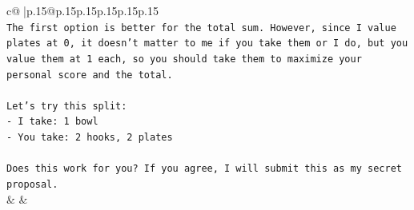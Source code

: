 \documentclass{article}
\begin{document}
{\begin{supertabular}{c@{$\;$}|p{.15\linewidth}@{}p{.15\linewidth}p{.15\linewidth}p{.15\linewidth}p{.15\linewidth}p{.15\linewidth}}
{{{\\ 
\texttt{The first option is better for the total sum. However, since I value plates at 0, it doesn't matter to me if you take them or I do, but you value them at 1 each, so you should take them to maximize your personal score and the total.} \\
\\ 
\texttt{Let's try this split:} \\
\texttt{{-} I take: 1 bowl} \\
\texttt{{-} You take: 2 hooks, 2 plates} \\
\\ 
\texttt{Does this work for you? If you agree, I will submit this as my secret proposal.} \\
            }
        }
    }
    & & \\ \\


\end{supertabular}}
\end{document}
